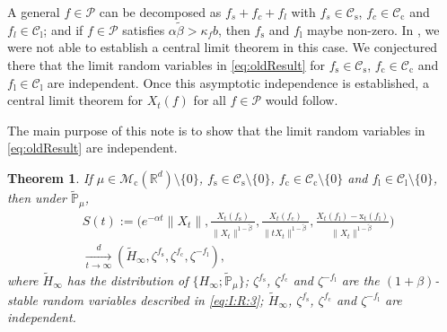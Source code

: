 \documentclass[12pt,a4paper]{amsart}
\theoremstyle{plain}
\newtheorem{thm}{Theorem}[section]
\theoremstyle{definition}
\numberwithin{equation}{section}
\begin{document}
	A general  $f \in \mathcal P$ can be decomposed as $f_s + f_c + f_l$ with $f_s \in \mathcal C_\mathrm s$, $f_c \in \mathcal C_\mathrm c$ and $f_l \in \mathcal C_\mathrm l$; and if $f\in  \mathcal P$ satisfies $\alpha \tilde \beta > \kappa_f b$, then $f_\mathrm s$ and $f_\mathrm l$ maybe non-zero. 
	In \cite{RenSongSunZhao2019Stable}, we were not able to
	establish a central limit theorem in this case. We conjectured there that the limit random variables in \eqref{eq:oldResult} 
	for $f_\mathrm s\in \mathcal C_\mathrm s$, $f_\mathrm c\in \mathcal C_\mathrm c$ and $f_\mathrm l\in \mathcal C_\mathrm l$ are independent. 
	Once this asymptotic independence is established, a central limit theorem  for $ X_t(f)$ for all $f\in  \mathcal P$ would follow.

	The main purpose of this note is to show that 
	the limit  random variables in \eqref{eq:oldResult} are independent.

\begin{thm}
	\label{thm:M}
	If $\mu\in \mathcal M_\mathrm c(\mathbb R^d)\setminus \{0\}$, $f_\mathrm s\in \mathcal C_\mathrm s\setminus\{0\}$, $f_\mathrm c \in \mathcal C_\mathrm c\setminus\{0\}$ and $f_\mathrm l \in \mathcal C_\mathrm l\setminus\{0\}$, then under $\mathbb {\widetilde P}_\mu$,
	\begin{align} \label{eq:M.1}
	&S(t):=
	\Bigg(e^{-\alpha t}\|X_t\|, \frac{X_t(f_\mathrm s)}{\|X_t\|^{1-\tilde \beta}},\frac{X_t(f_\mathrm c)}{\|tX_t\|^{1-\tilde \beta}},
	\frac{ X_t(f_\mathrm l) - \mathrm x_t(f_\mathrm l)}{\|X_t\|^{1-\tilde \beta}}
	\Bigg)
	\\&\xrightarrow[t\rightarrow \infty]{d}(\widetilde H_\infty,\zeta^{f_\mathrm s},\zeta^{f_\mathrm c},\zeta^{-f_\mathrm l}),
	\end{align}
	where $\widetilde H_\infty$ has the distribution of $\{H_{\infty}; \widetilde {\mathbb P}_\mu\}$; $\zeta^{f_\mathrm s}$, $\zeta^{f_\mathrm c}$ and $\zeta^{-f_\mathrm l}$ are the $(1+\beta)$-stable random variables described in \eqref{eq:I:R:3}; $\widetilde H_\infty$,  $\zeta^{f_\mathrm s}$, $\zeta^{f_\mathrm c}$ and $\zeta^{-f_\mathrm l}$ are independent.
\end{thm}
\end{document}
